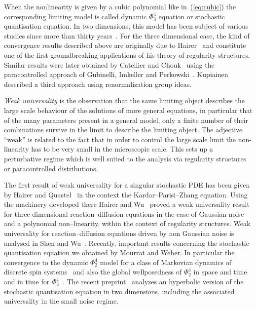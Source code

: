 \documentclass[a4paper,11pt]{article}
\newcommand{\tmtextit}[1]{{\itshape{#1}}}
\begin{document}
When the nonlinearity is given by a cubic polynomial like in~(\ref{eq:cubic})
the corresponding limiting model is called dynamic $\Phi^4_3$ equation or
stochastic quantisation equation. In two dimensions, this model has been
subject of various studies since more than thirty
years~{\cite{jona-lasinio_stochastic_1985,albeverio_stochastic_1991,da_prato_strong_2003}}.
For the three dimensional case, the kind of convergence results described
above are originally due to
Hairer~{\cite{hairer_theory_2014,hairer_regularity_2015}} and constitute one
of the first groundbreaking applications of his theory of regularity
structures. Similar results were later obtained by Catellier and
Chouk~{\cite{catellier_paracontrolled_2013}} using the paracontrolled approach
of Gubinelli, Imkeller and Perkowski~{\cite{gubinelli_paracontrolled_2012}}.
Kupiainen~{\cite{kupiainen_renormalization_2014}} described a third approach
using renormalization group ideas.

\tmtextit{Weak universality} is the observation that the same limiting object
describes the large scale behaviour of the solutions of more general
equations, in particular that of the many parameters present in a general
model, only a finite number of their combinations survive in the limit to
describe the limiting object. The adjective ``weak'' is related to the fact
that in order to control the large scale limit the non-linearity has to be
very small in the microscopic scale. This sets up a perturbative regime which
is well suited to the analysis via regularity structures or paracontrolled
distributions.

The first result of weak universality for a singular stochastic PDE has been
given by Hairer and Quastel~{\cite{hairer_class_2015}} in the context the
Kardar--Parisi--Zhang equation. Using the machinery developed there Hairer and
Wu~{\cite{hairer_large_2016}} proved a weak universality result for three
dimensional reaction--diffusion equations in the case of Gaussian noise and a
polynomial non--linearity, within the context of regularity structures. Weak
universality for reaction--diffusion equations driven by non Gaussian noise is
analysed in Shen and Wu~{\cite{shen_weak_2016}}. Recently, important results
concerning the stochastic quantisation equation we obtained by Mourrat and
Weber. In particular the convergence to the dynamic $\Phi^4_2$ model for a
class of Markovian dynamics of discrete spin
systems~{\cite{mourrat_convergence_2014}} and also the global wellposedness of
$\Phi^4_2$ in space and time~{\cite{mourrat_global_2015}} and in time for
$\Phi^4_3$~{\cite{mourrat_global_2016}}. The recent
preprint~{\cite{gubinelli_renormalization_2017}} analyzes an hyperbolic version
of the stochastic quantisation equation in two dimensions, including the
associated universality in the small noise regime.
\end{document}
